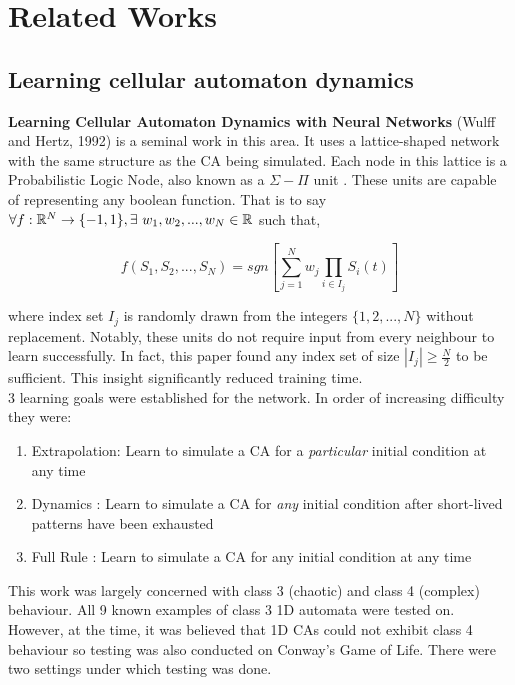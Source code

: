 \chapter{Related Works}

\section{Learning cellular automaton dynamics}

\noindent
\textbf{Learning Cellular Automaton Dynamics with Neural Networks} (Wulff and Hertz, 1992) \cite{wulff1992learning} is a seminal work in this area.
It uses a lattice-shaped network with the same structure as the CA being simulated.
Each node in this lattice is a Probabilistic Logic Node, also known as a $\Sigma-\Pi$ unit \cite{gurney1992training}.
These units are capable of representing any boolean function.
That is to say $ \forall f: \mathbb{R}^N \to \{-1, 1\}, \exists~w_1, w_2, ... , w_N \in \mathbb{R} $ such that,

\begin{equation} \label{eq:sigma_pi}
f(S_1, S_2, ..., S_N) = sgn\left[ \sum_{j=1}^{N} w_j \prod_{i \in I_j} S_i(t) \right]
\end{equation}

\noindent
where index set $I_j$ is randomly drawn from the integers $\{1, 2, ..., N\}$ without replacement.
Notably, these units do not require input from every neighbour to learn successfully.
In fact, this paper found any index set of size $|I_j| \geq \frac{N}{2}$ to be sufficient.
This insight significantly reduced training time.\\ 
3 learning goals were established for the network.
In order of increasing difficulty they were:

\begin{enumerate}
  \item Extrapolation: Learn to simulate a CA for a \textit{particular} initial condition at any time
  \item Dynamics : Learn to simulate a CA for \textit{any} initial condition after short-lived patterns have been exhausted
  \item Full Rule : Learn to simulate a CA for any initial condition at any time
\end{enumerate}

This work was largely concerned with class 3 (chaotic) and class 4 (complex) behaviour. 
All 9 known examples of class 3 1D automata were tested on.
However, at the time, it was believed that 1D CAs could not exhibit class 4 behaviour so testing was also conducted on Conway's Game of Life.
There were two settings under which testing was done.
 

